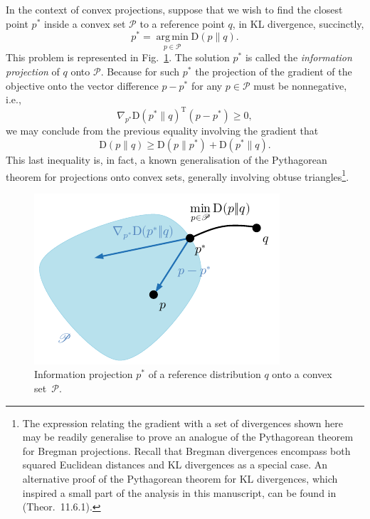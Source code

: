 In the context of convex projections, suppose that we wish to find the closest point $p^*$ inside a convex set $\mathscr{P}$ to a reference point $q$, in KL divergence, succinctly,
\begin{equation*}
p^*=\operatorname*{arg\,min}_{p\in\mathscr{P}} \mathrm{D}(p\|q).
\end{equation*}
This problem is represented in Fig.~\ref{fig:1}. The solution $p^*$ is called the \emph{information projection} of $q$ onto $\mathscr{P}$. Because for such $p^*$ the projection of the gradient of the objective onto the vector difference $p-p^*$ for any $p\in\mathscr{P}$ must be nonnegative, i.e.,
\begin{equation*}
\nabla_{p^*}\mathrm{D}(p^*\|q)^\mathrm{T}(p-p^*)\geqslant 0,
\end{equation*}
we may conclude from the previous equality involving the gradient that
\begin{equation*}
\mathrm{D}(p\|q)\geqslant\mathrm{D}(p\|p^*)+\mathrm{D}(p^*\|q).
\end{equation*}
This last inequality is, in fact, a known generalisation of the Pythagorean theorem for projections onto convex sets, generally involving obtuse triangles\footnote{The expression relating the gradient with a set of divergences shown here may be readily generalise to prove an analogue of the Pythagorean theorem for Bregman projections. Recall that Bregman divergences encompass both squared Euclidean distances and KL divergences as a special case. An alternative proof of the Pythagorean theorem for KL divergences, which inspired a small part of the analysis in this manuscript, can be found in~\cite{cover91b} (Theor.~11.6.1).}.

\begin{figure}[htb]
\centering
\includegraphics[scale=\FigScale]{figures/ConvProj.pdf}
\caption{Information projection $p^*$ of a reference distribution $q$ onto a convex set~$\mathscr{P}$.}
\label{fig:1}
\end{figure}

